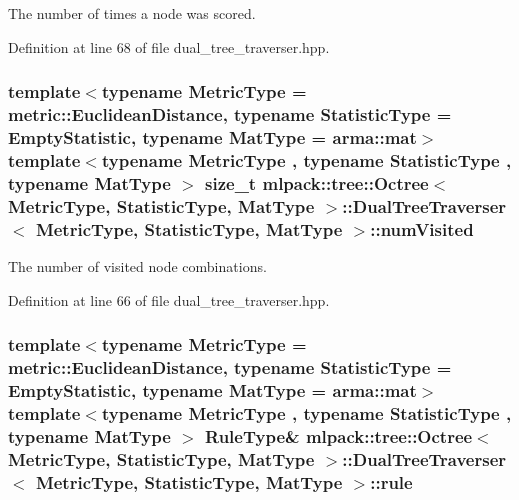The number of times a node was scored. 



Definition at line 68 of file dual\+\_\+tree\+\_\+traverser.\+hpp.

\subsubsection[{num\+Visited}]{\setlength{\rightskip}{0pt plus 5cm}template$<$typename Metric\+Type  = metric\+::\+Euclidean\+Distance, typename Statistic\+Type  = Empty\+Statistic, typename Mat\+Type  = arma\+::mat$>$ template$<$typename Metric\+Type , typename Statistic\+Type , typename Mat\+Type $>$ size\+\_\+t {\bf mlpack\+::tree\+::\+Octree}$<$ Metric\+Type, Statistic\+Type, Mat\+Type $>$\+::{\bf Dual\+Tree\+Traverser}$<$ Metric\+Type, Statistic\+Type, Mat\+Type $>$\+::num\+Visited\hspace{0.3cm}{\ttfamily [private]}}\label{classmlpack_1_1tree_1_1Octree_1_1DualTreeTraverser_a3265e0f237153f363e3bc18fff59fe07}


The number of visited node combinations. 



Definition at line 66 of file dual\+\_\+tree\+\_\+traverser.\+hpp.

\subsubsection[{rule}]{\setlength{\rightskip}{0pt plus 5cm}template$<$typename Metric\+Type  = metric\+::\+Euclidean\+Distance, typename Statistic\+Type  = Empty\+Statistic, typename Mat\+Type  = arma\+::mat$>$ template$<$typename Metric\+Type , typename Statistic\+Type , typename Mat\+Type $>$ Rule\+Type\& {\bf mlpack\+::tree\+::\+Octree}$<$ Metric\+Type, Statistic\+Type, Mat\+Type $>$\+::{\bf Dual\+Tree\+Traverser}$<$ Metric\+Type, Statistic\+Type, Mat\+Type $>$\+::rule\hspace{0.3cm}{\ttfamily [private]}}\label{classmlpack_1_1tree_1_1Octree_1_1DualTreeTraverser_a411d89f94e0e50f9d9d9f28cd31ae6e9}


